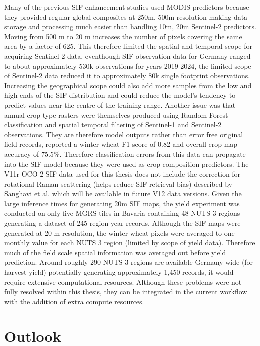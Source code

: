 Many of the previous SIF enhancement studies used MODIS predictors because they provided regular global composites at 250m, 500m resolution making data storage and processing much easier than handling 10m, 20m Sentinel-2 predictors. Moving from 500 m to 20 m increases the number of pixels covering the same area by a factor of 625. This therefore limited the spatial and temporal scope for acquiring Sentinel-2 data, eventhough SIF observation data for Germany ranged to about approximately 530k observations for years 2019-2024, the limited scope of Sentinel-2 data  reduced it to approximately 80k single footprint observations. Increasing the geographical scope could also add more samples from the low and high ends of the SIF distribution and could reduce the model's tendency to predict values near the centre of the training range. Another issue was that annual crop type rasters were themselves produced using Random Forest classification and spatial temporal filtering of Sentinel-1 and Sentinel-2 observations. They are therefore model outputs rather than error free original field records, \cite{gessner_crop_2025} reported a winter wheat F1-score of 0.82 and overall crop map accuracy of 75.5\%. Therefore classification errors from this data can propagate into the SIF model because they were used as crop composition predictors. The V11r OCO-2 SIF data used for this thesis does not include the correction for rotational Raman scattering (helps reduce SIF retrieval bias) described by Sanghavi et al. \cite{sanghavi2025impact} which will be available in future V12 data versions. Given the large inference times for generating 20m SIF maps, the yield experiment was conducted on only five MGRS tiles in Bavaria containing 48 NUTS 3 regions generating a dataset of 245 region-year records. Although the SIF maps were generated at 20 m resolution, the winter wheat pixels were averaged to one monthly value for each NUTS 3 region (limited by scope of yield data). Therefore much of the field scale spatial information was averaged out before yield prediction. Around roughly 290 NUTS 3 regions are available Germany wide (for harvest yield) potentially generating approximately 1,450 records, it would require extensive computational resources. Although these problems were not fully resolved within this thesis, they can be integrated in the current workflow with the addition of extra compute resources.


\section{Outlook\label{sec:outlook}}

